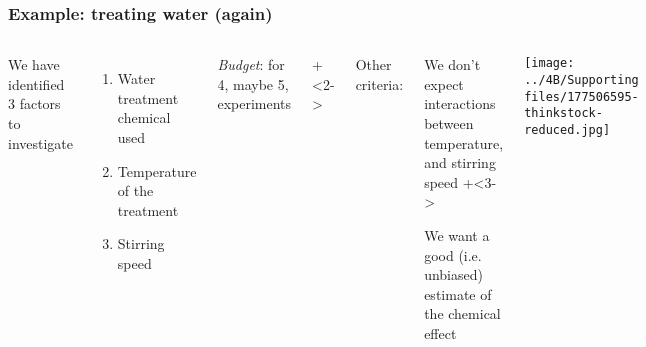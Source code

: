 \begin{frame}\frametitle{Example: treating water (again)}
	
	\begin{columns}[T]
			We have identified 3 factors to investigate
			\begin{enumerate}
				\item	Water treatment chemical used
				\item	Temperature of the treatment
				\item	Stirring speed
			\end{enumerate}
		
			\vspace{1cm}
			\emph{Budget}: for 4, maybe 5, experiments
			
			\onslide+<2->{
				\vspace{1cm}
				Other criteria:
				\begin{itemize}
					\item	We don't expect interactions between temperature, and stirring speed
					\onslide+<3->{
						\item	We want a good (i.e. unbiased) estimate of the chemical effect
					}
				\end{itemize}
			}
			
		
			\texttt{[image: ../4B/Supporting files/177506595-thinkstock-reduced.jpg]}
		
		
			
	\end{columns}
\end{frame}

